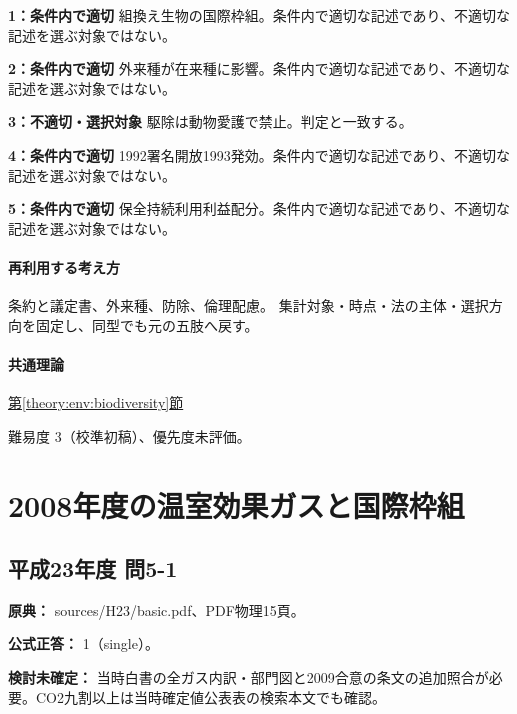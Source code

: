 \noindent\textbf{1：条件内で適切} 組換え生物の国際枠組。条件内で適切な記述であり、不適切な記述を選ぶ対象ではない。\par

\noindent\textbf{2：条件内で適切} 外来種が在来種に影響。条件内で適切な記述であり、不適切な記述を選ぶ対象ではない。\par

\noindent\textbf{3：不適切・選択対象} 駆除は動物愛護で禁止。判定と一致する。\par

\noindent\textbf{4：条件内で適切} 1992署名開放1993発効。条件内で適切な記述であり、不適切な記述を選ぶ対象ではない。\par

\noindent\textbf{5：条件内で適切} 保全持続利用利益配分。条件内で適切な記述であり、不適切な記述を選ぶ対象ではない。\par

\paragraph{再利用する考え方} 条約と議定書、外来種、防除、倫理配慮。 集計対象・時点・法の主体・選択方向を固定し、同型でも元の五肢へ戻す。

\paragraph{共通理論} \hyperref[theory:env:biodiversity]{第\ref*{theory:env:biodiversity}節}

\par 難易度 3（校準初稿）、優先度未評価。

\section{2008年度の温室効果ガスと国際枠組}

\subsection{平成23年度 問5-1}
\label{q:h23-reg-basic-5-1}

\noindent\textbf{原典：} sources/H23/basic.pdf、PDF物理15頁。

\textbf{公式正答：} 1（single）。

\par\textbf{検討未確定：} 当時白書の全ガス内訳・部門図と2009合意の条文の追加照合が必要。CO2九割以上は当時確定値公表表の検索本文でも確認。

